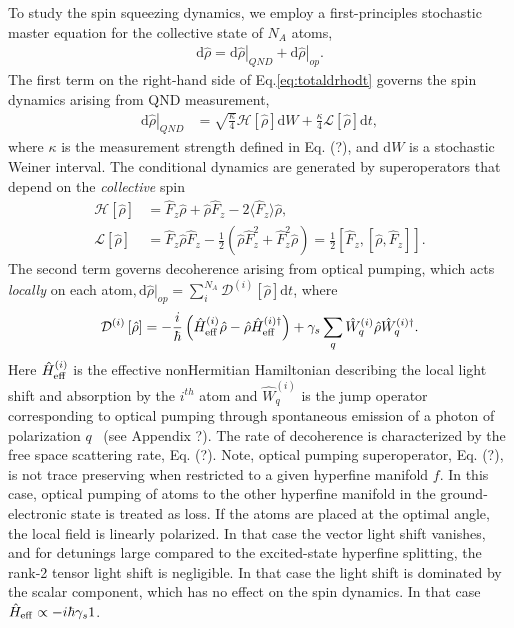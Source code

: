 \documentclass[preprint,aps,pra,onecolumn,superscriptaddress]{revtex4-1} %
\newcommand{\expect}[1]{\big\langle #1 \big\rangle}
\begin{document}
To study the spin squeezing dynamics, we employ a first-principles stochastic master equation for the collective state of $N_A$ atoms,
\begin{align}\label{eq:totaldrhodt}
\mathrm{d}\hat{\rho}= \left.\mathrm{d}\hat{\rho}\right|_{QND}+\left.\mathrm{d}\hat{\rho}\right|_{op}.
\end{align}
The first term on the right-hand side of Eq.\eqref{eq:totaldrhodt} governs the spin dynamics arising from QND measurement,
\begin{align}
\left.\mathrm{d}\hat{\rho}\right|_{QND} &= \sqrt{\frac{\kappa}{4}}\mathcal{H}\left[\hat{\rho} \right]\mathrm{d}W + \frac{\kappa}{4}\mathcal{L}\left[ \hat{\rho}\right]\mathrm{d}t, 
\end{align}
where  $\kappa$ is the measurement strength defined in Eq. (?), and $\mathrm{d}W$ is a stochastic Weiner interval. The conditional dynamics are generated by superoperators that depend on the {\em collective} spin
\begin{subequations}
\begin{align}
\mathcal{H}\left[ \hat{\rho}\right] &= \hat{F}_z \hat{\rho} + \hat{\rho}\hat{F}_z -2\expect{\hat{F}_z}\hat{\rho}, \\
\mathcal{L}\left[ \hat{\rho} \right] &= \hat{F}_z \hat{\rho}\hat{F}_z -\frac{1}{2}\left(\hat{\rho}\hat{F}_z^2+\hat{F}_z^2\hat{\rho} \right)=\frac{1}{2}\left[\hat{F}_z,\left[\hat{\rho},\hat{F}_z \right] \right].
\end{align}
\end{subequations}
The second term governs decoherence arising from optical pumping, which acts {\em locally} on each atom$,\mathrm{d}\hat{\rho}|_{op}=\sum_i^{N_A} \mathcal{D}^{(i)}\left[ \hat{\rho}\right] \mathrm{d}t$, where 
\begin{equation}
\mathcal{D}^{(i)}\left[ \hat{\rho}\right] = -\frac{i}{\hbar}\left(\hat{H}^{(i)}_{\rm eff}\hat{\rho} - \hat{\rho} \hat{H}^{(i)\dag}_{\rm eff}\right) + \gamma_s\sum_q \hat{W}^{(i)}_q \hat{\rho}\hat{W}^{(i)\dag}_q.
\end{equation}
Here $\hat{H}^{(i)}_{\rm eff}$ is the effective nonHermitian Hamiltonian describing the local light shift and absorption by the $i^{th}$ atom and $\hat{W}^{(i)}_q$ is the jump operator corresponding to optical pumping through spontaneous emission of a photon of polarization $q$~\cite{Deutsch2010a} (see Appendix ?).   
The rate of decoherence is characterized by the free space scattering rate, Eq. (?).  Note, optical pumping superoperator, Eq. (?),  is not trace preserving when restricted to a given hyperfine manifold $f$.  In this case, optical pumping of atoms to the other hyperfine manifold in the ground-electronic state is treated as loss.  If the atoms are placed at the optimal angle, the local field is linearly polarized.  In that case the vector light shift vanishes, and for detunings large compared to the excited-state hyperfine splitting, the rank-2 tensor light shift is negligible.  In that case the light shift is dominated by the scalar component, which has no effect on the spin dynamics.  In that case $\hat{H}_{\rm eff} \propto -i\hbar \gamma_s 1$.
\end{document}
